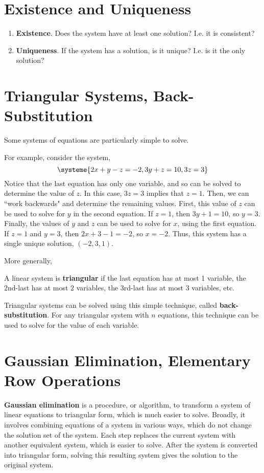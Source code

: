 \documentclass[letterpaper,12pt]{article}
\begin{document}
\section*{Existence and Uniqueness}
\begin{enumerate}
    \item \textbf{Existence}. Does the system have at least one solution? I.e. it is consistent?
    \item \textbf{Uniqueness}. If the system has a solution, is it unique? I.e. is it the only solution?
\end{enumerate}

\section*{Triangular Systems, Back-Substitution}
Some systems of equations are particularly simple to solve. 

\begin{example}
For example, consider the system,
\begin{equation*}
    \systeme{2x + y - z = -2, 3y + z = 10, 3z = 3}
\end{equation*}
Notice that the last equation has only one variable, and so can be solved to determine the value of $z$. In this case, $3z = 3$ implies that $z = 1$. Then, we can ``work backwards" and determine the remaining values. First, this value of $z$ can be used to solve for $y$ in the second equation. If $z = 1$, then $3y + 1 = 10$, so $y = 3$. Finally, the values of $y$ and $z$ can be used to solve for $x$, using the first equation. If $z = 1$ and $y = 3$, then $2x + 3 - 1 = -2$, so $x = -2$. Thus, this system has a single unique solution, $(-2,3,1)$.
\end{example}

More generally,

\begin{definition}
A linear system is \textbf{triangular} if the last equation has at most 1 variable, the 2nd-last has at most 2 variables, the 3rd-last has at most 3 variables, etc.
\end{definition}

Triangular systems can be solved using this simple technique, called \textbf{back-substitution}. For any triangular system with $n$ equations, this technique can be used to solve for the value of each variable.

\section*{Gaussian Elimination, Elementary Row Operations}
\textbf{Gaussian elimination} is a procedure, or algorithm, to transform a system of linear equations to triangular form, which is much easier to solve. Broadly, it involves combining equations of a system in various ways, which do not change the solution set of the system. Each step replaces the current system with another equivalent system, which is easier to solve. After the system is converted into triangular form, solving this resulting system gives the solution to the original system.
\end{document}
